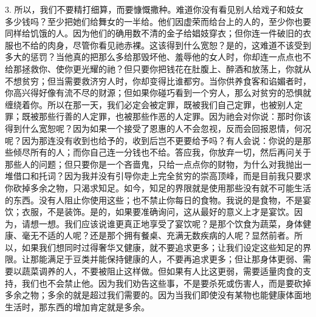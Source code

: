 3. 所以，我们不要精打细算，而要慷慨撒种。难道你没有看见别人给戏子和妓女多少钱吗？至少把她们给舞女的一半给。他们因虚荣而给台上的人的，至少你也要同样给饥饿的人。因为他们的确用数不清的金子给娼妓穿衣；但你连一件破旧的衣服也不给的肉身，尽管你看见祂赤裸。这该得到什么宽恕？是的，这难道不该受到多大的惩罚？当他真的把那么多给那毁坏他、羞辱他的女人时，你却连一点点也不给那拯救你、使你更光耀的祂？但只要你把钱花在肚腹上、醉酒和放荡上，你就从不想贫穷；但当需要救济穷人时，你却变得比谁都穷。当你供养食客和谄媚者时，你高兴得好像有流不尽的财源；但如果你碰巧看到一个穷人，那么对贫穷的恐惧就缠绕着你。所以在那一天，我们必定会被定罪，既被我们自己定罪，也被别人定罪；既被那些行善的人定罪，也被那些作恶的人定罪。因为祂会对你说：那时你该得到什么宽恕呢？因为如果一个接受了恩惠的人不会忽视，反而会回报恩情，何况呢？因为那连没有收到也给予的，收到后岂不更要给予吗？有人会说：你说的是那些倾尽所有的人；而你自己连一分钱也不给。答应我，你放弃一切，然后再问关于那些人的问题；但只要你是一个吝啬鬼，只给一点点你的财物，为什么对我抛出一堆借口和托词？因为我并没有引导你走上完全贫穷的崇高顶峰，而是目前我只要求你砍掉多余之物，只渴求知足。如今，知足的界限就是使用那些没有就不可能生活的东西。没有人阻止你使用这些；也不禁止你每日的食物。我说的是食物，不是宴饮；衣服，不是装饰。是的，如果要准确询问，这从最好的意义上才是宴饮。因为，请想一想。我们应该说谁更真正地享受了宴饮呢？是那个饮食为蔬菜，身体健康、毫无不适的人呢？还是那个拥有餐桌、充满无数疾病的人呢？显然前者。所以，如果我们想同时过得奢华又健康，就不要追求更多；让我们设定这些知足的界限。让那能满足于豆类并能保持健康的人，不要再追求更多；但让那身体更弱、需要以蔬菜调养的人，不要被阻止这样做。但如果有人比这更弱，需要适量肉食的支持，我们也不会禁止他。因为我们劝告这些事，不是要杀死或伤害人，而是要砍掉多余之物；多余的就是超过我们需要的。因为当我们即使没有某物也能健康体面地生活时，那东西的增加肯定就是多余。\par

